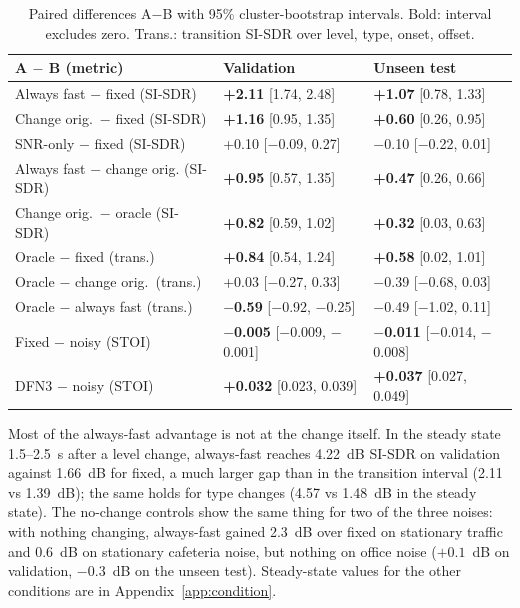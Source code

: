 \documentclass[10pt,conference,a4paper]{IEEEtran}
\newcommand{\sig}[1]{\textbf{#1}}
\begin{document}
\begin{table}[t]
\centering
\caption{Paired differences A$-$B with 95\% cluster-bootstrap intervals. Bold:
interval excludes zero. Trans.: transition SI-SDR over level, type, onset, offset.}
\label{tab:paired}
\small
\setlength{\tabcolsep}{8pt}
\begin{tabular}{@{}lll@{}}
\toprule
A $-$ B (metric) & Validation & Unseen test\\
\midrule
Always fast $-$ fixed (SI-SDR) & \sig{+2.11} [1.74, 2.48] & \sig{+1.07} [0.78, 1.33]\\
Change orig.\ $-$ fixed (SI-SDR) & \sig{+1.16} [0.95, 1.35] & \sig{+0.60} [0.26, 0.95]\\
SNR-only $-$ fixed (SI-SDR) & +0.10 [$-$0.09, 0.27] & $-$0.10 [$-$0.22, 0.01]\\
Always fast $-$ change orig. (SI-SDR) & \sig{+0.95} [0.57, 1.35] & \sig{+0.47} [0.26, 0.66]\\
Change orig.\ $-$ oracle (SI-SDR) & \sig{+0.82} [0.59, 1.02] & \sig{+0.32} [0.03, 0.63]\\
Oracle $-$ fixed (trans.) & \sig{+0.84} [0.54, 1.24] & \sig{+0.58} [0.02, 1.01]\\
Oracle $-$ change orig.\ (trans.) & +0.03 [$-$0.27, 0.33] & $-$0.39 [$-$0.68, 0.03]\\
Oracle $-$ always fast (trans.) & \sig{$-$0.59} [$-$0.92, $-$0.25] & $-$0.49 [$-$1.02, 0.11]\\
Fixed $-$ noisy (STOI) & \sig{$-$0.005} [$-$0.009, $-$0.001] & \sig{$-$0.011} [$-$0.014, $-$0.008]\\
DFN3 $-$ noisy (STOI) & \sig{+0.032} [0.023, 0.039] & \sig{+0.037} [0.027, 0.049]\\
\bottomrule
\end{tabular}
\end{table}

Most of the always-fast advantage is not at the change itself. In the steady
state 1.5--2.5~s after a level change, always-fast reaches 4.22~dB SI-SDR on
validation against 1.66~dB for fixed, a much larger gap than in the transition
interval (2.11 vs 1.39~dB); the same holds for type changes (4.57 vs 1.48~dB in
the steady state). The no-change controls show the same thing for two of the three noises: with
nothing changing, always-fast gained 2.3~dB over fixed on stationary traffic and
0.6~dB on stationary cafeteria noise, but nothing on office noise ($+0.1$~dB on
validation, $-0.3$~dB on the unseen test). Steady-state values for the other
conditions are in Appendix~\ref{app:condition}.
\end{document}
